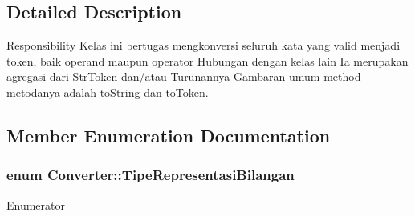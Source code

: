 \subsection{Detailed Description}
Responsibility Kelas ini bertugas mengkonversi seluruh kata yang valid menjadi token, baik operand maupun operator Hubungan dengan kelas lain Ia merupakan agregasi dari \hyperlink{class_str_token}{Str\-Token} dan/atau Turunannya Gambaran umum method metodanya adalah to\-String dan to\-Token. 

\subsection{Member Enumeration Documentation}
\hypertarget{class_converter_a1caaefa1f3fba463bd215e8e7f12872f}{
\subsubsection[{Tipe\-Representasi\-Bilangan}]{\setlength{\rightskip}{0pt plus 5cm}enum {\bf Converter\-::\-Tipe\-Representasi\-Bilangan}}}\label{class_converter_a1caaefa1f3fba463bd215e8e7f12872f}
\begin{Desc}
\item[Enumerator]\par
\begin{description}
\item[{\em 
\hypertarget{class_converter_a1caaefa1f3fba463bd215e8e7f12872fa42f9bbd983a4ccdf72f2fc2bfe26efe7}{\-\_\-\-Arab}\label{class_converter_a1caaefa1f3fba463bd215e8e7f12872fa42f9bbd983a4ccdf72f2fc2bfe26efe7}
}]\item[{\em 
\hypertarget{class_converter_a1caaefa1f3fba463bd215e8e7f12872faab56d50b2561f79548c4fc6e700d7005}{\-\_\-\-Romawi}\label{class_converter_a1caaefa1f3fba463bd215e8e7f12872faab56d50b2561f79548c4fc6e700d7005}
}]\item[{\em 
\hypertarget{class_converter_a1caaefa1f3fba463bd215e8e7f12872fa5688eeb94a505273115a1f2f75d40212}{\-\_\-\-Logika}\label{class_converter_a1caaefa1f3fba463bd215e8e7f12872fa5688eeb94a505273115a1f2f75d40212}
}]\end{description}
\end{Desc}


